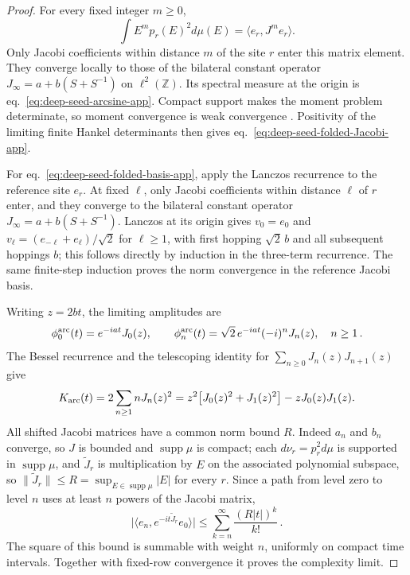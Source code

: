 \documentclass[a4paper,11pt]{article}
\def\dd{d}%
\def\ii{i}%
\def\ee{e}%
\def\Jac{J}%
\theoremstyle{definition}
\theoremstyle{remark}
\newcommand{\dd}{\mathrm d}
\newcommand{\ii}{\mathrm i}
\newcommand{\ee}{\mathrm e}
\newcommand{\Jac}{\mathsf J}
\newcommand{\supp}{\operatorname{supp}}
\begin{document}
\begin{proof}
For every fixed integer $m\ge0$,
\begin{equation}
   \int E^m p_r(E)^2\dd\mu(E)=\langle e_r,\Jac^m e_r\rangle.
   \label{eq:deep-seed-reference-bulk-app}
\end{equation}
Only Jacobi coefficients within distance $m$ of the site $r$ enter this matrix element.  They converge locally to those of the bilateral constant operator
$\Jac_\infty=a+b(S+S^{-1})$ on $\ell^2(\mathbb Z)$.  Its spectral measure at the origin is
eq.~\eqref{eq:deep-seed-arcsine-app}.  Compact support makes the moment problem determinate, so
moment convergence is weak convergence \cite{VanAssche1995}.  Positivity of the limiting finite
Hankel determinants then gives eq.~\eqref{eq:deep-seed-folded-Jacobi-app}.

For eq.~\eqref{eq:deep-seed-folded-basis-app}, apply the Lanczos recurrence to the reference
site $e_r$.  At fixed $\ell$, only Jacobi coefficients within distance $\ell$ of $r$ enter, and
they converge to the bilateral constant operator
$\Jac_\infty=a+b(S+S^{-1})$.  Lanczos at its origin gives
$v_0=e_0$ and
$v_\ell=(e_{-\ell}+e_\ell)/\sqrt2$ for $\ell\ge1$, with first hopping
$\sqrt2\,b$ and all subsequent hoppings $b$; this follows directly by induction in the
three-term recurrence.  The same finite-step induction proves the norm convergence in the
reference Jacobi basis.

Writing $z=2bt$, the limiting amplitudes are
\begin{equation}
   \phi_0^{\rm arc}(t)=\ee^{-\ii at}J_0(z),
   \qquad
   \phi_n^{\rm arc}(t)=\sqrt2\,\ee^{-\ii at}(-\ii)^nJ_n(z),
   \quad n\ge1\,.
   \label{eq:deep-seed-folded-dynamics-app}
\end{equation}
The Bessel recurrence and the telescoping identity for
$\sum_{n\ge0}J_n(z)J_{n+1}(z)$ give
\begin{equation}
   K_{\rm arc}(t)=2\sum_{n\ge1}nJ_n(z)^2
   =z^2\bigl[J_0(z)^2+J_1(z)^2\bigr]-zJ_0(z)J_1(z).
   \label{eq:deep-seed-folded-complexity-app}
\end{equation}
All shifted Jacobi matrices have a common norm bound $R$. Indeed $a_n$ and $b_n$ converge, so $\Jac$ is bounded and $\supp\mu$ is compact; each $\dd\nu_r=p_r^2\dd\mu$ is supported in $\supp\mu$, and $\widetilde\Jac_r$ is multiplication by $E$ on the associated polynomial subspace, so $\|\widetilde\Jac_r\|\le R=\sup_{E\in\supp\mu}|E|$ for every $r$.  Since a path from level zero to level
$n$ uses at least $n$ powers of the Jacobi matrix,
\begin{equation}
   \bigl|\langle e_n,\ee^{-\ii t\widetilde\Jac_r}e_0\rangle\bigr|
   \le\sum_{k=n}^{\infty}\frac{(R|t|)^k}{k!}\,.
   \label{eq:compact-Jacobi-path-tail-app}
\end{equation}
The square of this bound is summable with weight $n$, uniformly on compact time intervals.
Together with fixed-row convergence it proves the complexity limit.
\end{proof}
\end{document}
